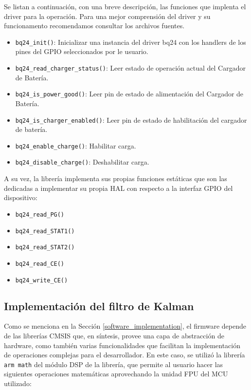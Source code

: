 \documentclass[10pt, a4paper]{report}
\begin{document}
Se listan a continuación, con una breve descripción, las funciones que implenta
el driver para la operación. Para una mejor comprensión del driver y su
funcionamento recomendamos consultar los archivos fuentes.

\begin{itemize}
    \item \texttt{bq24\_init()}: Inicializar una instancia del driver bq24 con
        los handlers de los pines del GPIO seleccionados por le usuario.
    \item \texttt{bq24\_read\_charger\_status()}: Leer estado de operación
        actual del Cargador de Batería.
    \item \texttt{bq24\_is\_power\_good()}: Leer pin de estado de alimentación
        del Cargador de Batería.
    \item \texttt{bq24\_is\_charger\_enabled()}: Leer pin de estado de
        habilitación del cargador de batería.
    \item \texttt{bq24\_enable\_charge()}: Habilitar carga.
    \item \texttt{bq24\_disable\_charge()}: Deshabilitar carga.
\end{itemize}

A su vez, la librer\'ia implementa sus propias funciones est\'aticas que son las
dedicadas a implementar su propia \acrshort{HAL} con respecto a la interfaz
\acrshort{GPIO} del dispositivo: 

\begin{itemize}
    \item \texttt{bq24\_read\_PG()}
    \item \texttt{bq24\_read\_STAT1()}
    \item \texttt{bq24\_read\_STAT2()}
    \item \texttt{bq24\_read\_CE()}
    \item \texttt{bq24\_write\_CE()}
\end{itemize}

\subsection{Implementaci\'on del filtro de Kalman}\label{dev_fw_kalman}

Como se menciona en la Secci\'on \ref{software_implementation}, el firmware
depende de las librer\'ias \acrshort{CMSIS} que, en s\'intesis, provee una capa de 
abstracci\'on de hardware, como tambi\'en varias funcionalidades que facilitan 
la implementaci\'on de operaciones complejas para el desarrollador. En este 
caso, se utiliz\'o la librer\'ia \texttt{arm math} del m\'odulo \acrshort{DSP} 
de la librer\'ia, que permite al usuario hacer las siguientes  operaciones 
matem\'aticas aprovechando la unidad \acrshort{FPU} del \acrshort{MCU} 
utilizado:
\end{document}
